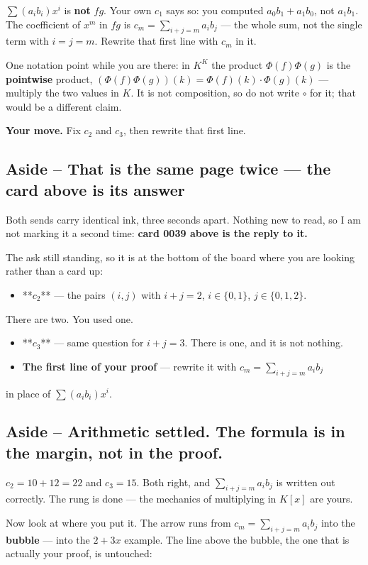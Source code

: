 \documentclass[11pt]{article}
\begin{document}
$\sum (a_ib_i)x^i$ is \textbf{not} $fg$. Your own $c_1$ says so: you computed
$a_0b_1 + a_1b_0$, not $a_1b_1$. The coefficient of $x^m$ in $fg$ is
$c_m = \sum_{i+j=m} a_ib_j$ --- the whole sum, not the single term with $i = j = m$.
Rewrite that first line with $c_m$ in it.

One notation point while you are there: in $K^K$ the product $\Phi(f)\Phi(g)$ is
the \textbf{pointwise} product, $(\Phi(f)\Phi(g))(k) = \Phi(f)(k)\cdot\Phi(g)(k)$ ---
multiply the two values in $K$. It is not composition, so do not write $\circ$
for it; that would be a different claim.

\textbf{Your move.} Fix $c_2$ and $c_3$, then rewrite that first line.


\subsection*{Aside -- That is the same page twice --- the card above is its answer}
Both sends carry identical ink, three seconds apart. Nothing new to read, so I
am not marking it a second time: \textbf{card 0039 above is the reply to it.}

The ask still standing, so it is at the bottom of the board where you are
looking rather than a card up:

\begin{itemize}
  \item **$c_2$** --- the pairs $(i,j)$ with $i+j=2$, $i \in \{0,1\}$, $j \in \{0,1,2\}$.
\end{itemize}
  There are two. You used one.
\begin{itemize}
  \item **$c_3$** --- same question for $i+j=3$. There is one, and it is not nothing.
  \item \textbf{The first line of your proof} --- rewrite it with $c_m = \sum_{i+j=m} a_ib_j$
\end{itemize}
  in place of $\sum(a_ib_i)x^i$.


\subsection*{Aside -- Arithmetic settled. The formula is in the margin, not in the proof.}
$c_2 = 10 + 12 = 22$ and $c_3 = 15$. Both right, and $\sum_{i+j=m} a_ib_j$ is
written out correctly. The rung is done --- the mechanics of multiplying in $K[x]$
are yours.

Now look at where you put it. The arrow runs from $c_m = \sum_{i+j=m} a_ib_j$
into the \textbf{bubble} --- into the $2+3x$ example. The line above the bubble, the one
that is actually your proof, is untouched:
\end{document}
